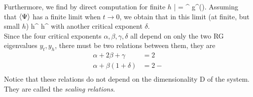 \ee 
Furthermore, we find by direct computation for finite $h$
\bse 
 \bar{\Psi} = ^{} g^\prime \left(\right).
\ese
Assuming that $\expval{\Psi}$ has a finite limit when $t\rightarrow 0$, we obtain that in this limit (at finite,
but small $h$) 
\be 
\expval{\Psi} \quad \propto \quad h^{} \equiv h^{}
\ee 
with another critical exponent $\delta$.\\
Since the four critical exponents $α, β, γ, δ$ all depend on only the two RG eigenvalues
$y_t,y_h$, there must be two relations between them, they are
\begin{align}
	\alpha + 2\beta + \gamma &= 2 \\
	\alpha + \beta(1+\delta) &=2- \\
\end{align}
Notice that these relations do not depend on the dimensionality D of the system.
They are called the \emph{scaling relations}.











